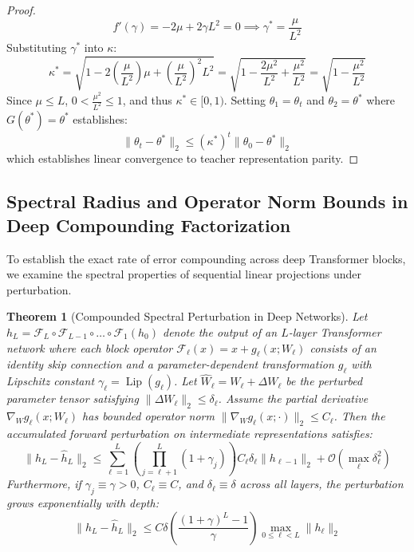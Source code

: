 \documentclass{article}
\newtheorem{theorem}{Theorem}
\begin{document}
\begin{proof}
\begin{equation}
    f'(\gamma) = -2\mu + 2\gamma L^2 = 0 \implies \gamma^* = \frac{\mu}{L^2}
\end{equation}
Substituting $\gamma^*$ into $\kappa$:
\begin{equation}
    \kappa^* = \sqrt{1 - 2 \left(\frac{\mu}{L^2}\right) \mu + \left(\frac{\mu}{L^2}\right)^2 L^2} = \sqrt{1 - \frac{2\mu^2}{L^2} + \frac{\mu^2}{L^2}} = \sqrt{1 - \frac{\mu^2}{L^2}}
\end{equation}
Since $\mu \le L$, $0 < \frac{\mu^2}{L^2} \le 1$, and thus $\kappa^* \in [0, 1)$. Setting $\theta_1 = \theta_t$ and $\theta_2 = \theta^*$ where $G(\theta^*) = \theta^*$ establishes:
\begin{equation}
    \|\theta_t - \theta^*\|_2 \le (\kappa^*)^t \|\theta_0 - \theta^*\|_2
\end{equation}
which establishes linear convergence to teacher representation parity.
\end{proof}

\subsection{Spectral Radius and Operator Norm Bounds in Deep Compounding Factorization}
To establish the exact rate of error compounding across deep Transformer blocks, we examine the spectral properties of sequential linear projections under perturbation.

\begin{theorem}[Compounded Spectral Perturbation in Deep Networks]
\label{thm:spectral_compounding}
Let $h_L = \mathcal{F}_L \circ \mathcal{F}_{L-1} \circ \dots \circ \mathcal{F}_1(h_0)$ denote the output of an $L$-layer Transformer network where each block operator $\mathcal{F}_\ell(x) = x + g_\ell(x; W_\ell)$ consists of an identity skip connection and a parameter-dependent transformation $g_\ell$ with Lipschitz constant $\gamma_\ell = \operatorname{Lip}(g_\ell)$. Let $\hat{W}_\ell = W_\ell + \Delta W_\ell$ be the perturbed parameter tensor satisfying $\|\Delta W_\ell\|_2 \le \delta_\ell$. Assume the partial derivative $\nabla_W g_\ell(x; W_\ell)$ has bounded operator norm $\|\nabla_W g_\ell(x; \cdot)\|_2 \le C_\ell$.
Then the accumulated forward perturbation on intermediate representations satisfies:
\begin{equation}
    \|h_L - \hat{h}_L\|_2 \le \sum_{\ell=1}^L \left( \prod_{j=\ell+1}^L (1 + \gamma_j) \right) C_\ell \delta_\ell \|h_{\ell-1}\|_2 + \mathcal{O}\left(\max_\ell \delta_\ell^2\right)
\end{equation}
Furthermore, if $\gamma_j \equiv \gamma > 0$, $C_\ell \equiv C$, and $\delta_\ell \equiv \delta$ across all layers, the perturbation grows exponentially with depth:
\begin{equation}
    \|h_L - \hat{h}_L\|_2 \le C \delta \left( \frac{(1 + \gamma)^L - 1}{\gamma} \right) \max_{0 \le \ell < L} \|h_\ell\|_2
\end{equation}
\end{theorem}
\end{document}
